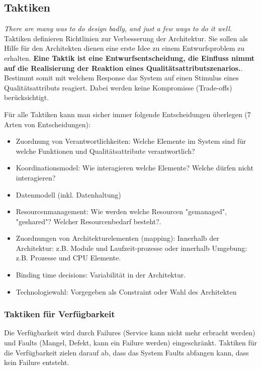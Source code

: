 \subsection{Taktiken}
\emph{There are many was to do design badly, and just a few ways to do it well.} Taktiken definieren Richtlinien zur Verbesserung der Architektur. Sie sollen als Hilfe für den Architekten dienen eine erste Idee zu einem Entwurfsproblem zu erhalten. \textbf{Eine Taktik ist eine Entwurfsentscheidung, die Einfluss nimmt auf die Realisierung der Reaktion eines Qualitätsattributszenarios.}. Bestimmt somit mit welchem Response das System auf einen Stimulus eines Qualitätsattributs reagiert. Dabei werden keine Kompromisse (Trade-offs) berücksichtigt.

Für alle Taktiken kann man sicher immer folgende Entscheidungen überlegen (7 Arten von Entscheidungen):
\begin{itemize}
	\item Zuordnung von Verantwortlichkeiten: Welche Elemente im System sind für welche Funktionen und Qualitätsattribute verantwortlich?
	\item Koordinationsmodel: Wie interagieren welche Elemente? Welche dürfen nicht interagieren?
	\item Datenmodell (inkl. Datenhaltung)
	\item Resourcenmanagement: Wie werden welche Resourcen "gemanaged", "geshared"? Welcher Resourcenbedarf besteht?.
	\item Zuordnungen von Architekturelementen (mapping): Innerhalb der Architektur: z.B. Module und Laufzeit-prozesse oder innerhalb Umgebung: z.B. Prozesse und CPU Elemente.
	\item Binding time decisions: Variabilität in der Architektur.
	\item Technologiewahl: Vorgegeben als Constraint oder Wahl des Architekten
\end{itemize}

\subsubsection{Taktiken für Verfügbarkeit}

Die Verfügbarkeit wird durch Failures (Service kann nicht mehr erbracht werden) und Faults (Mangel, Defekt, kann ein Failure werden) eingeschränkt. Taktiken für die Verfügbarkeit zielen darauf ab, dass das System Faults abfangen kann, dass kein Failure entsteht.

